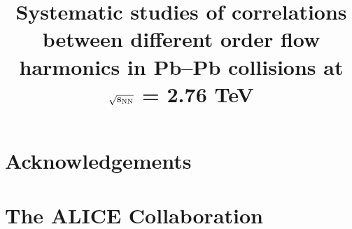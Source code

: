 \documentclass[ALICE,manyauthors]{cernphprep}
\begin{document}
%
%
\newcommand{\PbPb}{\textnormal{Pb--Pb}}
\newcommand{\AuAu}{\textnormal{Au--Au}}
\newcommand{\tn}[1]{\textnormal{#1}}
\newcommand{\snn}{\ensuremath{\sqrt{s_\tn{NN}}}}
\newcommand{\chisqndf}{\chi^2/N_{\rm dof}}
\newcommand{\CKBNOTE}[1]{{\bf CKB:  #1}} 
\renewcommand{\CKBNOTE}[1]{}  %

\newcommand{\RHNOTE}[1]{{\bf RH:  #1}} 
\renewcommand{\RHNOTE}[1]{}  %
\newcommand{\multfigsize}{0.95}
\begin{titlepage}
%
%
%
\title{Systematic studies of correlations between different order flow harmonics in Pb--Pb collisions at $\mathbf{\sqrt{s_{\rm NN}}}$ = 2.76 TeV}

%
%
\begin{abstract}

\end{abstract}
\end{titlepage}
\setcounter{page}{2}


\newenvironment{acknowledgement}{\relax}{\relax}
\begin{acknowledgement}
\section*{Acknowledgements}
\end{acknowledgement}
%
%
%
%


% 
%
%


\newpage
%

%
\section{The ALICE Collaboration}
\label{app:collab}
%
\end{document}
